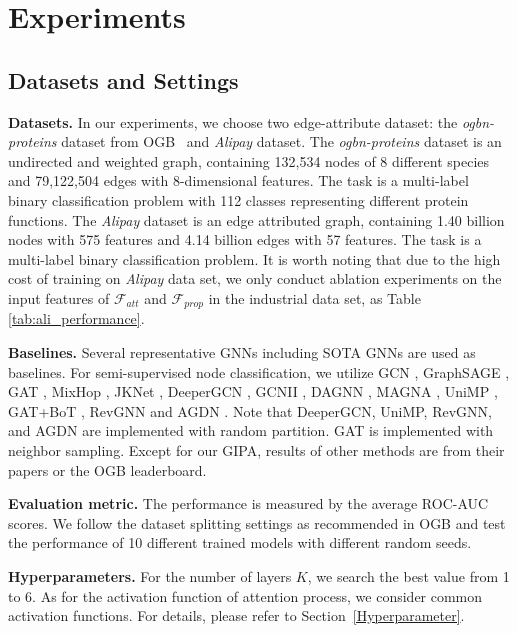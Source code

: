 \documentclass[runningheads]{llncs}
\newcommand{\model}{GIPA\xspace}
\begin{document}
\section{Experiments}
\subsection{Datasets and Settings}
\noindent \textbf{Datasets.} In our experiments, we choose two edge-attribute dataset: the \textit{ogbn-proteins} dataset from OGB~\cite{hu2020open} and \textit{Alipay} dataset\cite{graphtheta}. The \textit{ogbn-proteins} dataset is an undirected and weighted graph, containing 132,534 nodes of 8 different species and 79,122,504 edges with 8-dimensional features. The task is a multi-label binary classification problem with 112 classes representing different protein functions. The \textit{Alipay} dataset is an edge attributed graph, containing 1.40 billion nodes with 575 features and 4.14 billion edges with 57 features. The task is a multi-label binary classification problem. It is worth noting that due to the 
high cost of training on \textit{Alipay} data set, we only conduct ablation experiments on the
input features of $\mathcal{F}_{att}$ and $\mathcal{F}_{prop}$ in the industrial data set, as Table \ref{tab:ali_performance}.

\noindent \textbf{Baselines.} Several representative GNNs including SOTA GNNs are used as baselines. For semi-supervised node classification, we utilize GCN \cite{kipf2016semi}, GraphSAGE \cite{hamilton2017inductive}, GAT \cite{velivckovic2017graph}, MixHop \cite{abu2019mixhop}, JKNet \cite{xu2018representation}, DeeperGCN \cite{li2020deepergcn}, GCNII \cite{chen2020simple}, DAGNN \cite{liu2020towards}, MAGNA \cite{wang2020direct}, UniMP \cite{shi2020masked}, GAT+BoT \cite{wang2021bag}, RevGNN \cite{li2021training} and AGDN \cite{sun2020adaptive}. Note that DeeperGCN, UniMP, RevGNN, and AGDN are implemented with random partition. GAT is implemented with neighbor sampling. Except for our \model, results of other methods are from their papers or the OGB leaderboard.

\noindent \textbf{Evaluation metric.} The performance is measured by the average ROC-AUC scores. We follow the dataset splitting settings as recommended in OGB and test the performance of 10 different trained models with different random seeds. 

\noindent \textbf{Hyperparameters.} For the number of layers $K$, we search the best value from 1 to 6. As for the activation function of attention process, we consider common activation functions. For details, please refer to Section~\ref{Hyperparameter}.
\end{document}
